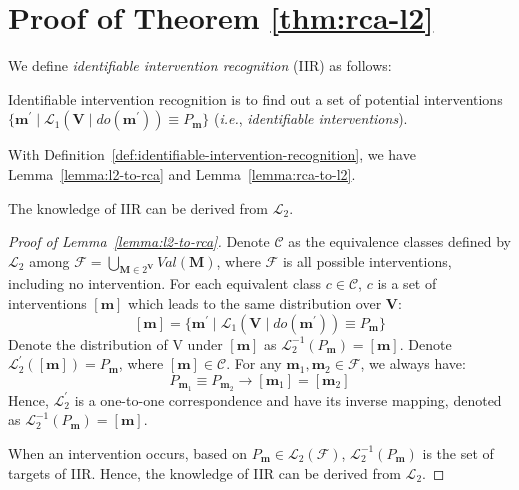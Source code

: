 \section{Proof of Theorem \ref{thm:rca-l2}}\label{sec:proof-rca-l2}

We define \textit{identifiable intervention recognition} (IIR) as follows:

\begin{definition}\label{def:identifiable-intervention-recognition}
	Identifiable intervention recognition is to find out a set of potential interventions $\{\mathbf{m}^{\prime} \mid \mathcal{L}_{1}(\mathbf{V} \mid do(\mathbf{m}^{\prime})) \equiv P_{\mathbf{m}} \}$ (\textit{i.e.}, \textit{identifiable interventions}).
\end{definition}

With Definition~\ref{def:identifiable-intervention-recognition}, we have Lemma~\ref{lemma:l2-to-rca} and Lemma~\ref{lemma:rca-to-l2}.

\begin{lemma}\label{lemma:l2-to-rca}
	The knowledge of IIR can be derived from $\mathcal{L}_{2}$.
\end{lemma}
\begin{proof}[Proof of Lemma~\ref{lemma:l2-to-rca}]
	Denote $\mathcal{C}$ as the equivalence classes defined by $\mathcal{L}_{2}$ among $\mathcal{F} = \bigcup_{\mathbf{M} \in 2^{\mathbf{V}}} Val(\mathbf{M})$, where $\mathcal{F}$ is all possible interventions, including no intervention.
	For each equivalent class $c \in \mathcal{C}$, $c$ is a set of interventions $[\mathbf{m}]$ which leads to the same distribution over $\mathbf{V}$:
	$$[\mathbf{m}] = \{\mathbf{m}^{\prime} \mid \mathcal{L}_{1}(\mathbf{V} \mid do(\mathbf{m}^{\prime})) \equiv P_{\mathbf{m}}\}$$
	Denote the distribution of V under $[\mathbf{m}]$ as $\mathcal{L}_{2}^{-1}(P_{\mathbf{m}}) = [\mathbf{m}]$.
	Denote $\mathcal{L}_{2}^{\prime}([\mathbf{m}]) = P_{\mathbf{m}}$, where $[\mathbf{m}] \in \mathcal{C}$.
	For any $\mathbf{m}_{1}, \mathbf{m}_{2} \in \mathcal{F}$, we always have:
	$$P_{\mathbf{m}_{1}} \equiv P_{\mathbf{m}_{2}} \rightarrow [\mathbf{m}_{1}] = [\mathbf{m}_{2}]$$
	Hence, $\mathcal{L}_{2}^{\prime}$ is a one-to-one correspondence and have its inverse mapping, denoted as $\mathcal{L}_{2}^{-1}(P_{\mathbf{m}}) = [\mathbf{m}]$.

	When an intervention occurs, based on $P_{\mathbf{m}} \in \mathcal{L}_{2}(\mathcal{F})$, $\mathcal{L}_{2}^{-1}(P_{\mathbf{m}})$ is the set of targets of IIR.
	Hence, the knowledge of IIR can be derived from $\mathcal{L}_{2}$.
\end{proof}

